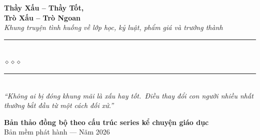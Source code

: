 \begin{titlepage}
\begin{center}
  {\fontsize{30}{36}\selectfont\bfseries\color{truyenred!80!black}
    Thầy Xấu -- Thầy Tốt,}\\[0.25cm]
  {\fontsize{28}{34}\selectfont\bfseries\color{truyenred!80!black}
    Trò Xấu -- Trò Ngoan}\\[0.8cm]

  {\fontsize{17}{21}\selectfont\color{truyengold!90!black}\itshape
    Khung truyện tình huống về lớp học, kỷ luật, phẩm giá và trưởng thành}\\[1cm]

  {\color{truyenblue!60}\rule{7cm}{1pt}}\\[5pt]
  {\color{truyengold!80!black}\large$\diamond$\hspace{1cm}$\diamond$\hspace{1cm}$\diamond$}\\[5pt]
  {\color{truyenblue!60}\rule{7cm}{1pt}}\\[1.2cm]

  {\normalsize\itshape\color{truyenblue!90!black}
   ``Không ai bị đóng khung mãi là xấu hay tốt.\
   Điều thay đổi con người nhiều nhất thường bắt đầu từ một cách đối xử.''}

  \vfill

  {\fontsize{15}{19}\selectfont\bfseries\color{truyenblue!90!black}
    Bản thảo đồng bộ theo cấu trúc series kể chuyện giáo dục}\\[0.35cm]

  {\small\color{gray} Bản mềm phát hành --- Năm 2026}\\[0.5cm]
\end{center}

\afterpage{\nopagecolor}
\end{titlepage}
